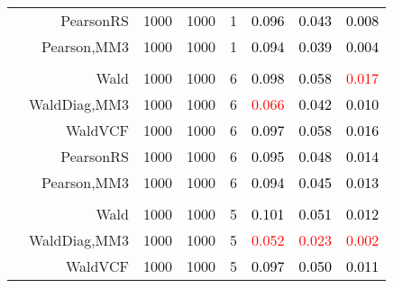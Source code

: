 \documentclass[
]{article}
\begin{document}
\begin{table}[H]
{\begin{tabular}[t]{lrrrrrrr}
\hspace{1em} & PearsonRS & 1000 & 1000 & 1 & \textcolor{black}{0.096} & \textcolor{black}{0.043} & \textcolor{black}{0.008}\\

\hspace{1em} & Pearson,MM3 & 1000 & 1000 & 1 & \textcolor{black}{0.094} & \textcolor{black}{0.039} & \textcolor{black}{0.004}\\
\cmidrule{1-8}
\addlinespace[0.3em]
\multicolumn{8}{l}{\textbf{1F 15V}}\\
\hspace{1em} & Wald & 1000 & 1000 & 6 & \textcolor{black}{0.098} & \textcolor{black}{0.058} & \textcolor{red}{0.017}\\

\hspace{1em} & WaldDiag,MM3 & 1000 & 1000 & 6 & \textcolor{red}{0.066} & \textcolor{black}{0.042} & \textcolor{black}{0.010}\\

\hspace{1em} & WaldVCF & 1000 & 1000 & 6 & \textcolor{black}{0.097} & \textcolor{black}{0.058} & \textcolor{black}{0.016}\\

\hspace{1em} & PearsonRS & 1000 & 1000 & 6 & \textcolor{black}{0.095} & \textcolor{black}{0.048} & \textcolor{black}{0.014}\\

\hspace{1em} & Pearson,MM3 & 1000 & 1000 & 6 & \textcolor{black}{0.094} & \textcolor{black}{0.045} & \textcolor{black}{0.013}\\
\cmidrule{1-8}
\addlinespace[0.3em]
\multicolumn{8}{l}{\textbf{2F 10V}}\\
\hspace{1em} & Wald & 1000 & 1000 & 5 & \textcolor{black}{0.101} & \textcolor{black}{0.051} & \textcolor{black}{0.012}\\

\hspace{1em} & WaldDiag,MM3 & 1000 & 1000 & 5 & \textcolor{red}{0.052} & \textcolor{red}{0.023} & \textcolor{red}{0.002}\\

\hspace{1em} & WaldVCF & 1000 & 1000 & 5 & \textcolor{black}{0.097} & \textcolor{black}{0.050} & \textcolor{black}{0.011}\\


\end{tabular}}
\end{table}
\end{document}
